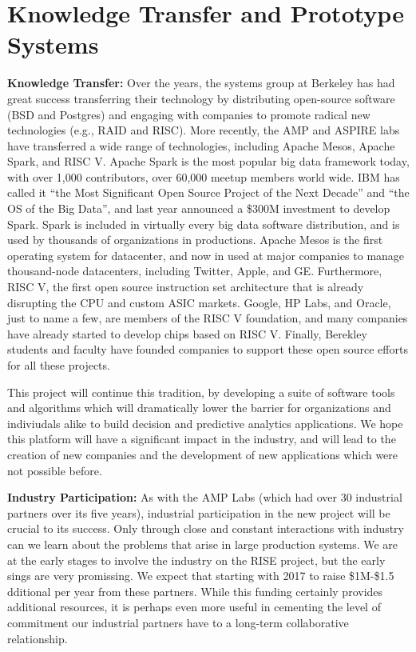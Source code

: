 \section{Knowledge Transfer and Prototype Systems}

{\bf Knowledge Transfer:} Over the years, the systems group at Berkeley has had great success transferring their technology by distributing open-source software (\eg BSD and Postgres) and engaging with companies to promote radical new technologies (e.g., RAID and RISC).  More recently, the AMP and ASPIRE labs have transferred a wide range of technologies, including Apache Mesos, Apache Spark, and RISC V. Apache Spark is the most popular big data framework today, with over 1,000 contributors, over 60,000 meetup members world wide. IBM has called it ``the Most Significant Open Source Project of the Next Decade'' and ``the OS of the Big Data'', and last year announced a \$300M investment to develop Spark. Spark is included in virtually every big data software distribution, and is used by thousands of organizations in productions. Apache Mesos is the first operating system for datacenter, and now in used at major companies to manage thousand-node datacenters, including Twitter, Apple, and GE.  Furthermore, RISC V, the first open source instruction set architecture that is already disrupting the CPU and custom ASIC markets. Google, HP Labs, and Oracle, just to name a few, are members of the RISC V foundation, and many companies have already started to develop chips based on RISC V. Finally, Berekley students and faculty have founded companies to support these open source efforts for all these projects.

This project will continue this tradition, by developing a suite of software tools and algorithms which will dramatically lower the barrier for organizations and indiviudals alike to build decision and predictive analytics applications. We hope this platform will have a significant impact in the industry, and will lead to the creation of new companies and the development of new applications which were not possible before.


{\bf Industry Participation:} As with the AMP  Labs (which had over 30 industrial partners over its five years), industrial participation in the new project will be crucial to its success.  Only through close and constant interactions with industry can we learn about the problems that arise in large production systems.  We are at the early stages to involve the industry on the RISE project, but the early sings are very promissing. We expect that starting with 2017 to raise \$1M-\$1.5 dditional per year from these partners. While this funding certainly provides additional resources, it is perhaps even more useful in cementing the level of commitment our industrial partners have to a long-term collaborative relationship.

